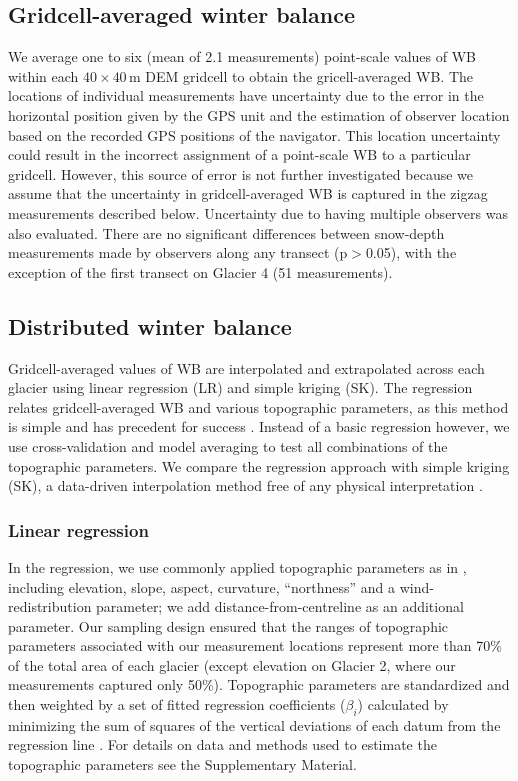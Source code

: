 \documentclass[review,oneside, letterpaper]{igs}
\begin{document}
\subsection{Gridcell-averaged winter balance}

We average one to six (mean of 2.1 measurements) point-scale values of WB within each $40 \times 40$\,m DEM gridcell to obtain the gricell-averaged WB. The locations of individual measurements have uncertainty due to the error in the horizontal position given by the GPS unit and the estimation of observer location based on the recorded GPS positions of the navigator. This location uncertainty could result in the incorrect assignment of a point-scale WB to a particular gridcell. However, this source of error is not further investigated because we assume that the uncertainty in gridcell-averaged WB is captured in the zigzag measurements described below. Uncertainty due to having multiple observers was also evaluated. There are no significant differences between snow-depth measurements made by observers along any transect (p$>$0.05), with the exception of the first transect on Glacier 4 (51 measurements). 

\subsection{Distributed winter balance}

Gridcell-averaged values of WB are interpolated and extrapolated across each glacier using linear regression (LR) and simple kriging (SK). The regression relates gridcell-averaged WB and various topographic parameters, as this method is simple and has precedent for success \citep[e.g.][]{McGrath2015}. Instead of a basic regression however, we use cross-validation and model averaging to test all combinations of the topographic parameters. We compare the regression approach with simple kriging (SK), a data-driven interpolation method free of any physical interpretation \citep[e.g.][]{Hock1999}.

\subsubsection{Linear regression}

In the regression, we use commonly applied topographic parameters as in \cite{McGrath2015}, including elevation, slope, aspect, curvature, ``northness'' and a wind-redistribution parameter; we add distance-from-centreline as an additional parameter. Our sampling design ensured that the ranges of topographic parameters associated with our measurement locations represent more than 70\% of the total area of each glacier (except elevation on Glacier 2, where our measurements captured only 50\%). Topographic parameters are standardized and then weighted by a set of fitted regression coefficients ($\beta_i$) calculated by minimizing the sum of squares of the vertical deviations of each datum from the regression line \citep{Davis1986}. For details on data and methods used to estimate the topographic parameters see the Supplementary Material. 
\end{document}
